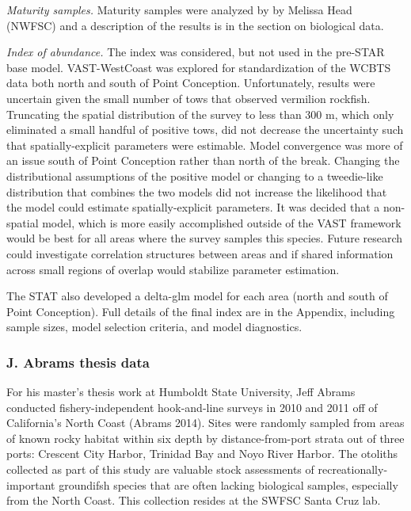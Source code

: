 \documentclass[11pt,
  english,
]{article}
\begin{document}
\emph{Maturity samples.} Maturity samples were analyzed by by Melissa Head (NWFSC) and a description of the results is in the section on biological data.

\emph{Index of abundance.} The index was considered, but not used in the pre-STAR base model. VAST-WestCoast was explored for standardization of the WCBTS data both north and south of Point Conception. Unfortunately, results were uncertain given the small number of tows that observed vermilion rockfish. Truncating the spatial distribution of the survey to less than 300 m, which only eliminated a small handful of positive tows, did not decrease the uncertainty such that spatially-explicit parameters were estimable. Model convergence was more of an issue south of Point Conception rather than north of the break. Changing the distributional assumptions of the positive model or changing to a tweedie-like distribution that combines the two models did not increase the likelihood that the model could estimate spatially-explicit parameters. It was decided that a non-spatial model, which is more easily accomplished outside of the VAST framework would be best for all areas where the survey samples this species. Future research could investigate correlation structures between areas and if shared information across small regions of overlap would stabilize parameter estimation.

The STAT also developed a delta-glm model for each area (north and south of Point Conception). Full details of the final index are in the Appendix, including sample sizes, model selection criteria, and model diagnostics.


\hypertarget{j.-abrams-thesis-data}{%
\subsubsection{J. Abrams thesis data}\label{j.-abrams-thesis-data}}

\leavevmode\tagmcend\tagstructend

For his master's thesis work at Humboldt State University, Jeff Abrams conducted fishery-independent hook-and-line surveys in 2010 and 2011 off of California's North Coast {(Abrams 2014)\leavevmode\tagmcend\tagstructend}. Sites were randomly sampled from areas of known rocky habitat within six depth by distance-from-port strata out of three ports: Crescent City Harbor, Trinidad Bay and Noyo River Harbor. The otoliths collected as part of this study are valuable stock assessments of recreationally-important groundifsh species that are often lacking biological samples, especially from the North Coast. This collection resides at the SWFSC Santa Cruz lab.
\end{document}
